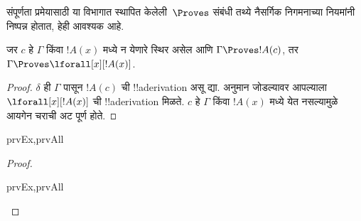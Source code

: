 \documentclass[../../../include/open-logic-section]{subfiles}
\begin{document}


\begin{explain}
  संपूर्णता प्रमेयासाठी या विभागात स्थापित केलेली~$\Proves$ संबंधी तथ्ये
  नैसर्गिक निगमनाच्या नियमांनी निष्पन्न होतात, हेही आवश्यक आहे.
\end{explain}

\begin{thm}
 जर $c$ हे $\Gamma$ किंवा $!A(x)$ मध्ये
न येणारे स्थिर असेल आणि $\Gamma \Proves !A(c)$, तर $\Gamma
\Proves \lforall[x][!A(x)]$.
\end{thm}

\begin{proof}
$\delta$ ही $\Gamma$ पासून $!A(c)$ ची !!a{derivation} असू द्या.
\Intro{\lforall} अनुमान जोडल्यावर आपल्याला $\lforall[x][!A(x)]$ ची
!!a{derivation} मिळते. $c$ हे $\Gamma$ किंवा $!A(x)$ मध्ये येत नसल्यामुळे
आयगेन चराची अट पूर्ण होते.
\end{proof}

\begin{prop}
\begin{tagenumerate}{prvEx,prvAll}

\end{tagenumerate}
\end{prop}

\begin{proof}
\begin{tagenumerate}{prvEx,prvAll}

\end{tagenumerate}
\end{proof}
\end{document}
